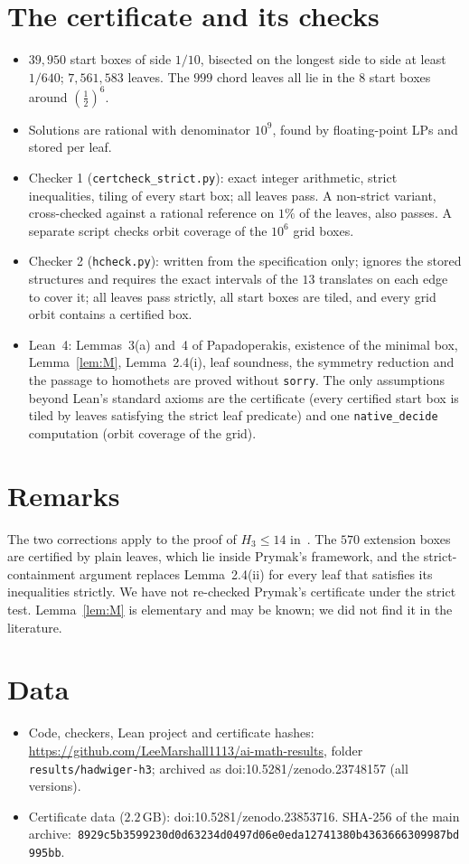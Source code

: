 \documentclass[11pt]{article}
\begin{document}
\section{The certificate and its checks}
\begin{itemize}
\item $39{,}950$ start boxes of side $1/10$, bisected on the longest side to side at least $1/640$;
  $7{,}561{,}583$ leaves. The $999$ chord leaves all lie in the $8$ start boxes around $(\tfrac12)^6$.
\item Solutions are rational with denominator $10^9$, found by floating-point LPs and stored per leaf.
\item Checker 1 (\texttt{certcheck\_strict.py}): exact integer arithmetic, strict inequalities, tiling of every
  start box; all leaves pass. A non-strict variant, cross-checked against a rational reference on $1\%$ of the
  leaves, also passes. A separate script checks orbit coverage of the $10^6$ grid boxes.
\item Checker 2 (\texttt{hcheck.py}): written from the specification only; ignores the stored structures and
  requires the exact intervals of the $13$ translates on each edge to cover it; all leaves pass strictly, all
  start boxes are tiled, and every grid orbit contains a certified box.
\item Lean~4: Lemmas~3(a) and~4 of Papadoperakis, existence of the minimal box, Lemma~\ref{lem:M}, Lemma~2.4(i),
  leaf soundness, the symmetry reduction and the passage to homothets are proved without \texttt{sorry}. The only
  assumptions beyond Lean's standard axioms are the certificate (every certified start box is tiled by leaves
  satisfying the strict leaf predicate) and one \texttt{native\_decide} computation (orbit coverage of the grid).
\end{itemize}

\section{Remarks}
The two corrections apply to the proof of $H_3\le14$ in~\cite{Pry}. The $570$ extension boxes are certified by
plain leaves, which lie inside Prymak's framework, and the strict-containment argument replaces Lemma~2.4(ii) for
every leaf that satisfies its inequalities strictly. We have not re-checked Prymak's certificate under the strict
test. Lemma~\ref{lem:M} is elementary and may be known; we did not find it in the literature.

\section*{Data}
\begin{itemize}
\item Code, checkers, Lean project and certificate hashes:
  \url{https://github.com/LeeMarshall1113/ai-math-results}, folder \texttt{results/hadwiger-h3}; archived as
  doi:10.5281/zenodo.23748157 (all versions).
\item Certificate data ($2.2$\,GB): doi:10.5281/zenodo.23853716. SHA-256 of the main archive:\
  \texttt{8929c5b3599230d0d63234d0497d06e0eda12741380b4363666309987bd995bb}.
\end{itemize}
\end{document}
